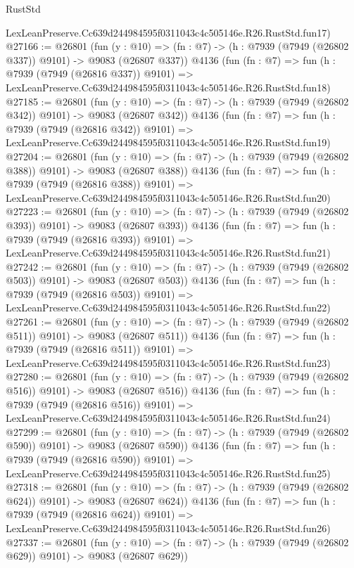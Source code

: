 \begin{lexlean}{RustStd}
\begin{coremodule}
    LexLeanPreserve.Cc639d244984595f0311043c4c505146e.R26.RustStd.fun17)
@27166 := @26801
    (fun (y : @10) => (fn : @7) -> (h : @7939 (@7949 (@26802 @337)) @9101) -> @9083 (@26807 @337))
    @4136
    (fun (fn : @7) =>
    fun (h : @7939 (@7949 (@26816 @337)) @9101) =>
    LexLeanPreserve.Cc639d244984595f0311043c4c505146e.R26.RustStd.fun18)
@27185 := @26801
    (fun (y : @10) => (fn : @7) -> (h : @7939 (@7949 (@26802 @342)) @9101) -> @9083 (@26807 @342))
    @4136
    (fun (fn : @7) =>
    fun (h : @7939 (@7949 (@26816 @342)) @9101) =>
    LexLeanPreserve.Cc639d244984595f0311043c4c505146e.R26.RustStd.fun19)
@27204 := @26801
    (fun (y : @10) => (fn : @7) -> (h : @7939 (@7949 (@26802 @388)) @9101) -> @9083 (@26807 @388))
    @4136
    (fun (fn : @7) =>
    fun (h : @7939 (@7949 (@26816 @388)) @9101) =>
    LexLeanPreserve.Cc639d244984595f0311043c4c505146e.R26.RustStd.fun20)
@27223 := @26801
    (fun (y : @10) => (fn : @7) -> (h : @7939 (@7949 (@26802 @393)) @9101) -> @9083 (@26807 @393))
    @4136
    (fun (fn : @7) =>
    fun (h : @7939 (@7949 (@26816 @393)) @9101) =>
    LexLeanPreserve.Cc639d244984595f0311043c4c505146e.R26.RustStd.fun21)
@27242 := @26801
    (fun (y : @10) => (fn : @7) -> (h : @7939 (@7949 (@26802 @503)) @9101) -> @9083 (@26807 @503))
    @4136
    (fun (fn : @7) =>
    fun (h : @7939 (@7949 (@26816 @503)) @9101) =>
    LexLeanPreserve.Cc639d244984595f0311043c4c505146e.R26.RustStd.fun22)
@27261 := @26801
    (fun (y : @10) => (fn : @7) -> (h : @7939 (@7949 (@26802 @511)) @9101) -> @9083 (@26807 @511))
    @4136
    (fun (fn : @7) =>
    fun (h : @7939 (@7949 (@26816 @511)) @9101) =>
    LexLeanPreserve.Cc639d244984595f0311043c4c505146e.R26.RustStd.fun23)
@27280 := @26801
    (fun (y : @10) => (fn : @7) -> (h : @7939 (@7949 (@26802 @516)) @9101) -> @9083 (@26807 @516))
    @4136
    (fun (fn : @7) =>
    fun (h : @7939 (@7949 (@26816 @516)) @9101) =>
    LexLeanPreserve.Cc639d244984595f0311043c4c505146e.R26.RustStd.fun24)
@27299 := @26801
    (fun (y : @10) => (fn : @7) -> (h : @7939 (@7949 (@26802 @590)) @9101) -> @9083 (@26807 @590))
    @4136
    (fun (fn : @7) =>
    fun (h : @7939 (@7949 (@26816 @590)) @9101) =>
    LexLeanPreserve.Cc639d244984595f0311043c4c505146e.R26.RustStd.fun25)
@27318 := @26801
    (fun (y : @10) => (fn : @7) -> (h : @7939 (@7949 (@26802 @624)) @9101) -> @9083 (@26807 @624))
    @4136
    (fun (fn : @7) =>
    fun (h : @7939 (@7949 (@26816 @624)) @9101) =>
    LexLeanPreserve.Cc639d244984595f0311043c4c505146e.R26.RustStd.fun26)
@27337 := @26801
    (fun (y : @10) => (fn : @7) -> (h : @7939 (@7949 (@26802 @629)) @9101) -> @9083 (@26807 @629))

\end{coremodule}
\end{lexlean}
